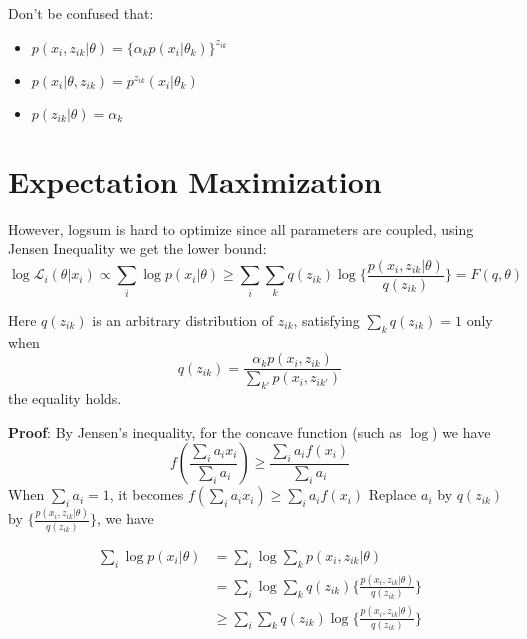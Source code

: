 \documentclass{article}
\begin{document}
Don't be confused that:
\begin{itemize}
	\item $p(x_i,z_{ik}|\theta) = \{\alpha_k p(x_i|\theta_k)\}^{z_{ik}}$
	\item $p(x_i|\theta,z_{ik}) = p^{z_{ik}}(x_i|\theta_k)$
	\item $p(z_{ik}|\theta) = \alpha_k$
\end{itemize}

\section{Expectation Maximization}
However, logsum is hard to optimize since all parameters are coupled, using Jensen Inequality we get the lower bound:
\begin{equation}
	\log\mathcal{L}_{i}(\theta|x_i) \propto \sum_{i} \log p(x_i|\theta) \geq \sum_{i} \sum_k q(z_{ik})\log\{\frac{p(x_i,z_{ik}|\theta)}{q(z_{ik})}\} = F(q,\theta)
\end{equation}

Here $q(z_{ik})$ is an arbitrary distribution of $z_{ik}$, satisfying $\sum_k q(z_{ik}) = 1$ only when
\begin{equation}
	q(z_{ik}) = \frac{\alpha_k p(x_i, z_{ik})}{\sum_{k'} p(x_i, z_{ik'})}
\end{equation}
the equality holds.

\textbf{Proof}:
By Jensen's inequality, for the concave function (such as $\log$) we have
\begin{equation}
	f(\frac{\sum_i a_i x_i}{\sum_i a_i}) \geq \frac{\sum_i a_i f(x_i)}{\sum_i a_i}
\end{equation}
When $\sum_i a_i = 1$, it becomes $f(\sum_i a_i x_i) \geq \sum_i a_i f(x_i)$
Replace $a_i$ by $q(z_{ik})$ by $\{\frac{p(x_i,z_{ik}|\theta)}{q(z_{ik})}\}$, we have

\begin{equation}
	\begin{aligned}
		\sum_i \log p(x_i|\theta) & = \sum_i \log \sum_k p(x_i, z_{i k}|\theta)                                 \\
		                          & = \sum_i \log \sum_k q(z_{ik}) \{\frac{p(x_i, z_{ik}|\theta)} {q(z_{ik})}\} \\
		                          & \geq \sum_i \sum_k q(z_{ik})\log\{\frac{p(x_i,z_{ik}|\theta)}{q(z_{ik})}\}
	\end{aligned}
	\label{eq: Ineq}
\end{equation}
\end{document}
